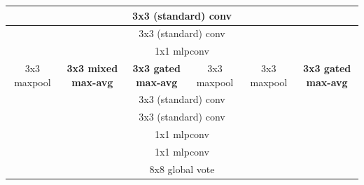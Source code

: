 \documentclass[twoside]{article}
\begin{document}
\begin{table}[ht]
\begin{centering}
{\begin{tabular}{c|c|c|c|c|c}
\hline 
\multicolumn{6}{c}{{{3x3 (standard) conv }}}\tabularnewline
\hline 
\multicolumn{6}{c}{{{3x3 (standard) conv }}}\tabularnewline
\hline 
\multicolumn{6}{c}{{{1x1 mlpconv}}}\tabularnewline
\hline 
{{3x3 maxpool}} & \textbf{{3x3 mixed max-avg}} & \textbf{{3x3 gated max-avg}} & 3x3 maxpool & 3x3 maxpool & \textbf{{3x3 gated max-avg}}\tabularnewline
\hline 
\multicolumn{6}{c}{{{3x3 (standard) conv }}}\tabularnewline
\hline 
\multicolumn{6}{c}{{{3x3 (standard) conv }}}\tabularnewline
\hline 
\multicolumn{6}{c}{{{1x1 mlpconv}}}\tabularnewline
\hline 
\multicolumn{6}{c}{{{1x1 mlpconv}}}\tabularnewline
\hline 
\multicolumn{6}{c}{{{8x8 global vote}}}\tabularnewline
\end{tabular}
}
\par
\end{centering}
\end{table}
 
\end{document}
